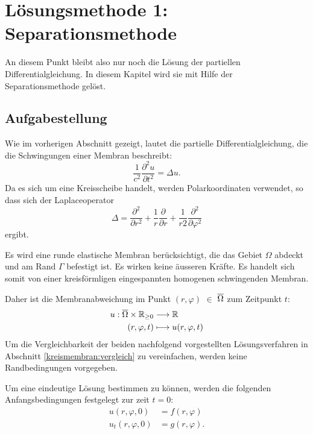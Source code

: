 %
%


\section{Lösungsmethode 1: Separationsmethode 
	\label{kreismembran:section:teil1}}
An diesem Punkt bleibt also nur noch die Lösung der partiellen Differentialgleichung. In diesem Kapitel wird sie mit Hilfe der Separationsmethode gelöst.

\subsection{Aufgabestellung\label{sub:aufgabestellung}}
Wie im vorherigen Abschnitt gezeigt, lautet die partielle Differentialgleichung, die die Schwingungen einer Membran beschreibt:
\begin{equation*}
	\frac{1}{c^2}\frac{\partial^2u}{\partial t^2} = \Delta u.
\end{equation*}
Da es sich um eine Kreisscheibe handelt, werden Polarkoordinaten verwendet, so dass sich der Laplaceoperator
\begin{equation*}
	\Delta
	=
	\frac{\partial^2}{\partial r^2}
	+
	\frac1r
	\frac{\partial}{\partial r}
	+
	\frac{1}{r 2}
	\frac{\partial^2}{\partial\varphi^2}
	\label{buch:pde:kreis:laplace}
\end{equation*}
ergibt.

Es wird eine runde elastische Membran berücksichtigt, die das Gebiet $\Omega$ abdeckt und am Rand $\Gamma$ befestigt ist.
Es wirken keine äusseren Kräfte. Es handelt sich somit von einer kreisförmligen eingespannten homogenen schwingenden Membran.

Daher ist die Membranabweichung im Punkt $(r,\varphi)$ $\in$ $\overline{\rm \Omega}$ zum Zeitpunkt $t$:
\begin{align*}
	u: \overline{\rm \Omega} \times \mathbb{R}_{\geq 0} &\longrightarrow \mathbb{R}\\
	(r,\varphi,t) &\longmapsto u(r,\varphi,t)
\end{align*}
Um die Vergleichbarkeit der beiden nachfolgend vorgestellten Lösungsverfahren in Abschnitt \ref{kreismembran:vergleich} zu vereinfachen, werden keine Randbedingungen vorgegeben.

Um eine eindeutige Lösung bestimmen zu können, werden die folgenden Anfangsbedingungen festgelegt zur zeit $t = \text{0}$:
\begin{align*}
	u(r,\varphi, 0) &= f(r,\varphi)\\
	u_t(r,\varphi, 0) &= g(r,\varphi).
\end{align*}

